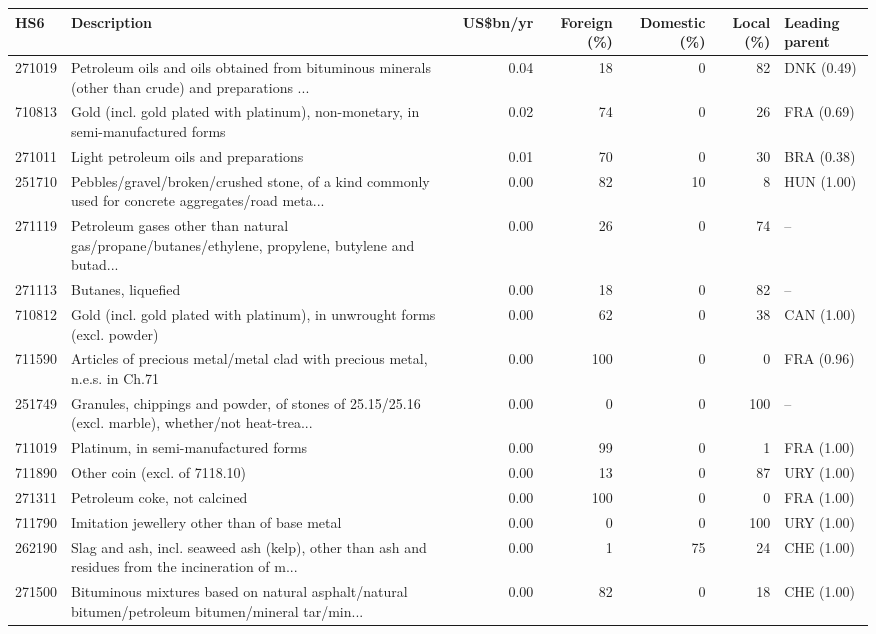 \begin{tabular}{@{}l p{6.4cm} r r r r l@{}}
\toprule
HS6 & Description & US\$bn/yr & Foreign (\%) & Domestic (\%) & Local (\%) & Leading parent \\
\midrule
271019 & Petroleum oils and oils obtained from bituminous minerals (other than crude) and preparations ... & 0.04 & 18 & 0 & 82 & DNK (0.49) \\
710813 & Gold (incl. gold plated with platinum), non-monetary, in semi-manufactured forms & 0.02 & 74 & 0 & 26 & FRA (0.69) \\
271011 & Light petroleum oils and preparations & 0.01 & 70 & 0 & 30 & BRA (0.38) \\
251710 & Pebbles/\allowbreak{}gravel/\allowbreak{}broken/\allowbreak{}crushed stone, of a kind commonly used for concrete aggregates/\allowbreak{}road meta... & 0.00 & 82 & 10 & 8 & HUN (1.00) \\
271119 & Petroleum gases other than natural gas/\allowbreak{}propane/\allowbreak{}butanes/\allowbreak{}ethylene, propylene, butylene and butad... & 0.00 & 26 & 0 & 74 & -- \\
271113 & Butanes, liquefied & 0.00 & 18 & 0 & 82 & -- \\
710812 & Gold (incl. gold plated with platinum), in unwrought forms (excl. powder) & 0.00 & 62 & 0 & 38 & CAN (1.00) \\
711590 & Articles of precious metal/\allowbreak{}metal clad with precious metal, n.e.s. in Ch.71 & 0.00 & 100 & 0 & 0 & FRA (0.96) \\
251749 & Granules, chippings and powder, of stones of 25.15/\allowbreak{}25.16 (excl. marble), whether/\allowbreak{}not heat-trea... & 0.00 & 0 & 0 & 100 & -- \\
711019 & Platinum, in semi-manufactured forms & 0.00 & 99 & 0 & 1 & FRA (1.00) \\
711890 & Other coin (excl. of 7118.10) & 0.00 & 13 & 0 & 87 & URY (1.00) \\
271311 & Petroleum coke, not calcined & 0.00 & 100 & 0 & 0 & FRA (1.00) \\
711790 & Imitation jewellery other than of base metal & 0.00 & 0 & 0 & 100 & URY (1.00) \\
262190 & Slag and ash, incl. seaweed ash (kelp), other than ash and residues from the incineration of m... & 0.00 & 1 & 75 & 24 & CHE (1.00) \\
271500 & Bituminous mixtures based on natural asphalt/\allowbreak{}natural bitumen/\allowbreak{}petroleum bitumen/\allowbreak{}mineral tar/\allowbreak{}min... & 0.00 & 82 & 0 & 18 & CHE (1.00) \\
\bottomrule
\end{tabular}
